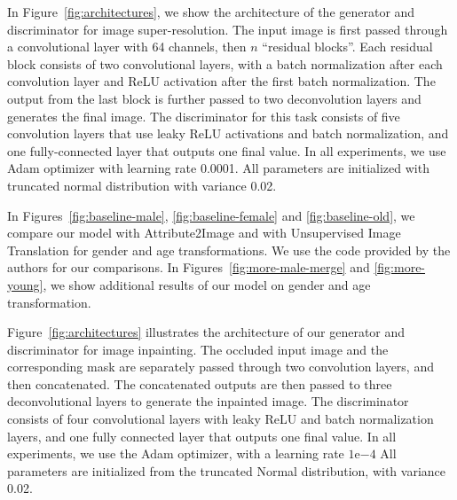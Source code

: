 \documentclass[10pt,twocolumn,letterpaper]{article}
\begin{document}
\begin{bibunit}[ieee]
\begin{appendices}
In Figure~\ref{fig:architectures}, we show the architecture of the generator and discriminator for image super-resolution.
The input image is first passed through a convolutional layer with 64 channels, then $n$ ``residual blocks''. Each residual block consists of two convolutional 
layers, with a batch normalization after each convolution layer and ReLU activation
after the first batch normalization. The output from the last block is further passed to two deconvolution layers
and generates the final image. 
The discriminator for this task consists of five convolution layers that use leaky ReLU activations and batch normalization, and one fully-connected layer that outputs one final value.
In all experiments, we use Adam optimizer with learning rate 0.0001.%
All parameters are initialized with truncated normal distribution with variance 0.02. 



In Figures~\ref{fig:baseline-male}, \ref{fig:baseline-female} and \ref{fig:baseline-old}, we compare our model with Attribute2Image  \cite{DBLP:journals/corr/YanYSL15} and with Unsupervised Image Translation \cite{DBLP:journals/corr/DongNWG17} for gender and age transformations. 
We use the code provided by the authors for our comparisons. 
In Figures~\ref{fig:more-male-merge} and \ref{fig:more-young},
we show additional results of our model on gender and age transformation.


Figure~\ref{fig:architectures} illustrates the architecture of our generator and discriminator for image inpainting.
The occluded input image and the corresponding mask are separately passed through two convolution 
layers, and then concatenated. The concatenated outputs are then passed to three deconvolutional layers  
to generate the inpainted image.  
The discriminator  consists of four convolutional layers  with leaky ReLU and batch normalization layers, and one fully connected layer that outputs one final value.  
In all experiments, we use the Adam optimizer, with a learning rate $1\mathrm{e}{-4}$%
All parameters are initialized from the truncated Normal distribution, with variance 0.02. 


\end{appendices}
\end{bibunit}
\end{document}
